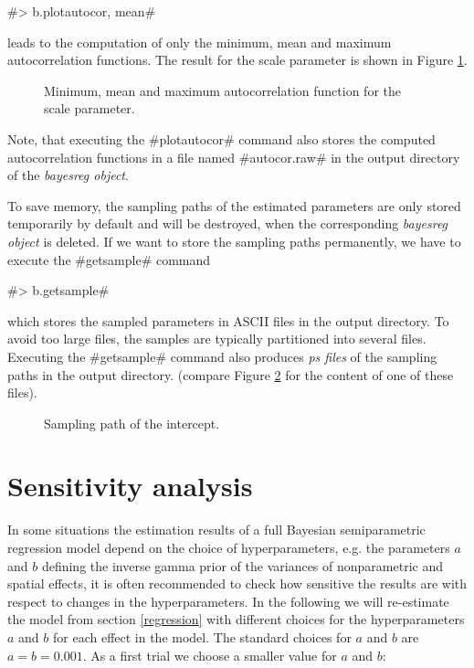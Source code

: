 \documentclass{article}
\begin{document}
#> b.plotautocor, mean#

leads to the computation of only the minimum, mean and maximum
autocorrelation functions. The result for the scale parameter is
shown in Figure \ref{autocor2}.

\begin{figure}[ht]
\begin{center}
{\it\caption{Minimum, mean and maximum autocorrelation function
for the scale parameter.\label{autocor2}}}
\end{center}
\end{figure}

Note, that executing the #plotautocor# command also stores the
computed autocorrelation functions in a file named #autocor.raw#
in the output directory of the {\it bayesreg object}.

To save memory, the sampling paths of the estimated parameters are
only stored temporarily by default and will be destroyed, when the
corresponding {\em bayesreg object} is deleted. If we want to
store the sampling paths permanently, we have to execute the
#getsample# command

#> b.getsample#

which stores the sampled parameters in ASCII files in the output
directory. To avoid too large files, the samples are typically
partitioned into several files. Executing the #getsample# command
also produces {\em ps files} of the sampling paths in the output
directory. (compare Figure \ref{sample1} for the content of one of
these files).

\begin{figure}[ht]
\begin{center}
{\it\caption{Sampling path of the intercept.\label{sample1}}}
\end{center}
\end{figure}

\section{Sensitivity analysis}\label{sensitivity}

In some situations the estimation results of a full Bayesian
semiparametric regression model depend on the choice of
hyperparameters, e.g. the parameters $a$ and $b$ defining the
inverse gamma prior of the variances of nonparametric and spatial
effects, it is often recommended to check how sensitive the
results are with respect to changes in the hyperparameters. In the
following we will re-estimate the model from section
\ref{regression} with different choices for the hyperparameters
$a$ and $b$ for each effect in the model. The standard choices for
$a$ and $b$ are $a=b=0.001$. As a first trial we choose a smaller
value for $a$ and $b$:
\end{document}
